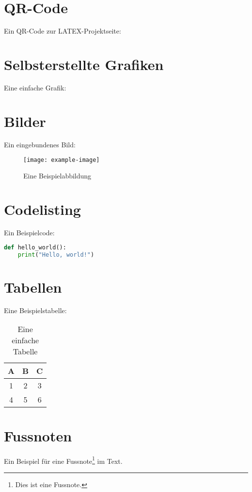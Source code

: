 \documentclass[a4paper,12pt]{article}
\begin{document}
\section{QR-Code}
Ein QR-Code zur LATEX-Projektseite:

\section{Selbsterstellte Grafiken}
Eine einfache Grafik:

\section{Bilder}
Ein eingebundenes Bild:
\begin{figure}[h!]
\centering
\texttt{[image: example-image]}
\caption{Eine Beispielabbildung}
\label{fig:beispiel}
\end{figure}

\section{Codelisting}
Ein Beispielcode:
\begin{lstlisting}[language=Python, caption={Beispielcode in Python}]
def hello_world():
    print("Hello, world!")
\end{lstlisting}

\section{Tabellen}
\label{sec:tabellen}
Eine Beispielstabelle:
\begin{table}[h!]
\centering
\begin{tabular}{|c|c|c|}
\hline
A & B & C \\
\hline
1 & 2 & 3 \\
\hline
4 & 5 & 6 \\
\hline
\end{tabular}
\caption{Eine einfache Tabelle}
\end{table}

\section{Fussnoten}
Ein Beispiel für eine Fussnote\footnote{Dies ist eine Fussnote.} im Text.

\newpage



\newpage
\printindex
\end{document}
